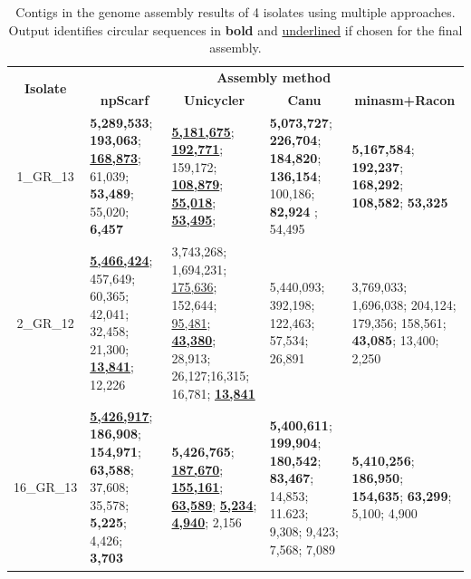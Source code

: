 \begin{landscape}
\begin{table}[!hpt]
\centering
\small
\caption[Genome assembly results using multiple approaches.]{Contigs in the genome assembly results of 4 \kp{} isolates using multiple approaches. Output identifies circular sequences in \textbf{bold} and \underline{underlined} if chosen for the final assembly.}
\label{tab:assers}
\begin{tabular}{cp{4cm}p{4cm}p{4cm}p{4cm}}
\hline
\toprule
\multirow{2}{*}{\textbf{Isolate}} & \multicolumn{4}{c}{\textbf{Assembly method}}\\ \cline{2-5} 
                        & \multicolumn{1}{c}{\textbf{npScarf}}  & \multicolumn{1}{c}{\textbf{Unicycler}}    & \multicolumn{1}{c}{\textbf{Canu}} & \multicolumn{1}{c}{\textbf{minasm+Racon}} \\ \hline
\rowcolor{Gray}
1\_GR\_13               & \cellcolor{white}\textbf{5,289,533}; \textbf{193,063}; \underline{\textbf{168,873}}; 61,039; \textbf{53,489}; 55,020; \textbf{6,457}              & \underline{\textbf{5,181,675}}; \underline{\textbf{192,771}}; 159,172; \underline{\textbf{108,879}}; \underline{\textbf{55,018}}; \underline{\textbf{53,495}};                                                        & \cellcolor{white}\textbf{5,073,727}; \textbf{226,704}; \textbf{184,820}; \textbf{136,154}; 100,186; \textbf{82,924 }; 54,495       & \textbf{5,167,584}; \textbf{192,237}; \textbf{168,292}; \textbf{108,582}; \textbf{53,325}                                \\
2\_GR\_12               & \cellcolor{Gray}\underline{\textbf{5,466,424}}; 457,649; 60,365; 42,041; 32,458; 21,300; \underline{\textbf{13,841}}; 12,226 & 3,743,268; 1,694,231; \underline{175,636}; 152,644; \underline{95,481}; \underline{\textbf{43,380}}; 28,913; 26,127;16,315; 16,781; \underline{\textbf{13,841}} & \cellcolor{Gray}5,440,093; 392,198; 122,463; 57,534; 26,891   & 3,769,033; 1,696,038; 204,124; 179,356; 158,561; \textbf{43,085}; 13,400; 2,250 \\
\rowcolor{Gray}
16\_GR\_13              & \cellcolor{white}\underline{\textbf{5,426,917}}; \textbf{186,908}; \textbf{154,971}; \textbf{63,588}; 37,608; 35,578; \textbf{5,225}; 4,426; \textbf{3,703}   & \textbf{5,426,765}; \underline{\textbf{187,670}}; \underline{\textbf{155,161}}; \underline{\textbf{63,589}}; \underline{\textbf{5,234}}; \underline{\textbf{4,940}}; 2,156  & \cellcolor{white}\textbf{5,400,611}; \textbf{199,904}; \textbf{180,542}; \textbf{83,467}; 14,853; 11.623; 9,308; 9,423; 7,568; 7,089 & \textbf{5,410,256}; \textbf{186,950}; \textbf{154,635}; \textbf{63,299}; 5,100; 4,900  \\ \hline

\end{tabular}
\end{table}
\end{landscape}

